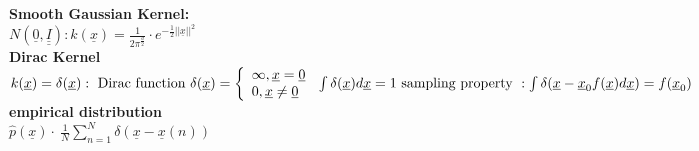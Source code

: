 \textbf{ Smooth Gaussian Kernel: } \\
$N(\underline{ 0 } , \underline{\underline{I } }) : k(\underline{x}) = \frac{1}{2 \pi ^{ \frac{d}{2}} }  \cdot e ^{ - \frac{1}{2} || \underline{x} ||^2 }$ \\
\textbf{ Dirac Kernel } \\
$ k (\underline{x}) = \delta (\underline{x}) : \text { Dirac function } \\
 \delta(\underline{x}) =  \left\lbrace
\begin{array}{l}
    \infty , \underline{x} = \underline{0 } \\
    0, \underline{x} \neq \underline{0}
\end{array} \right.  \\
 \int \delta  (\underline{x}) d \underline{x} = 1  \\
\text { sampling property } :  \int \delta (\underline{x} - \underline{x} _0 f(\underline{x}) d \underline{x}) = f (\underline{x}_0)$  \\
\textbf{  empirical distribution  } \\
$ \hat { p }(\underline{x}) \cdot   \ \frac{1}{N} \sum _ {n=1 } ^{N } \delta (\underline{x} - \underline{x} (n)) $ \\
